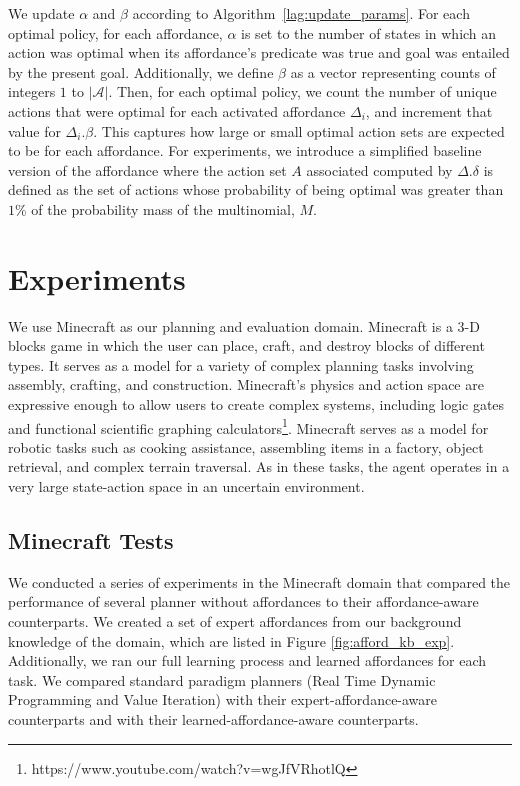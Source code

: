 \documentclass[conference]{IEEEtran}
\begin{document}
We update $\alpha$ and $\beta$ according to Algorithm~\ref{lag:update_params}.
For each optimal policy, for each affordance, $\alpha$ is set to the number of states in which an action was optimal
when its affordance's predicate was true and goal was entailed by the present goal.
Additionally, we define $\beta$ as a vector representing counts of
integers $1$ to $|\mathcal{A}|$. Then, for each optimal policy, we
count the number of unique actions that were optimal for each
activated affordance $\Delta_i$, and increment that value for
$\Delta_i.\beta$. This captures how large or small optimal action sets
are expected to be for each affordance. 
For experiments, we introduce a simplified baseline version of the affordance where
the action set $A$ associated computed by $\Delta.\delta$ is defined
as the set of actions whose probability of being optimal was greater than $1\%$
of the probability mass of the multinomial, $M$.

\section{Experiments}
\label{sec:experiments}

We use Minecraft as our planning and evaluation domain. Minecraft is a
 3-D blocks game in which the user can place, craft, and destroy blocks
 of different types. It serves as a model for a variety of complex planning tasks involving 
 assembly, crafting, and construction.  Minecraft's physics and action space are expressive
 enough to allow users to create complex systems, including logic gates and 
 functional scientific graphing calculators\footnote{https://www.youtube.com/watch?v=wgJfVRhotlQ}.
 Minecraft serves as a model for robotic tasks such as cooking assistance, assembling items in a factory, 
 object retrieval, and complex terrain traversal.  As in these tasks, the agent operates in a very large state-action space in an uncertain environment.

\subsection{Minecraft Tests}
We conducted a series of experiments in the Minecraft domain that
compared the performance of several planner without affordances
to their affordance-aware counterparts. We created a set of expert
affordances from our background knowledge of the domain, which are
listed in Figure \ref{fig:afford_kb_exp}. Additionally, we ran our full
learning process and learned affordances for each
task. We compared standard paradigm planners (Real Time Dynamic
Programming and Value Iteration) with their expert-affordance-aware
counterparts and with their learned-affordance-aware counterparts.
\end{document}

